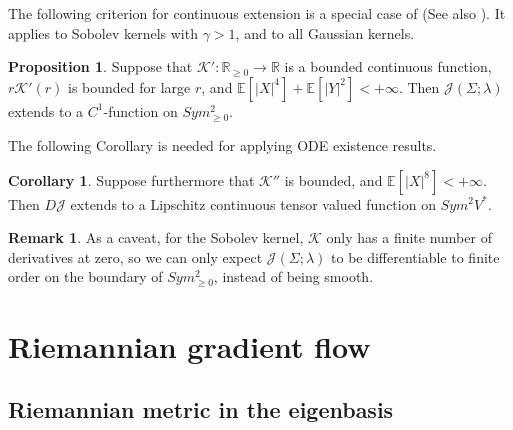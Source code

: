 \documentclass[a4paper]{article}
\theoremstyle{definition}
\newtheorem{cor}[thm]{Corollary}
\newtheorem{rmk}{Remark}
\newtheorem{prop}[thm]{Proposition}
\newcommand{\R}{\mathbb{R}}
\newcommand{\E}{\mathbb{E}}
\newcommand{\1}{\mathbbm{1}}
\begin{document}
	
	
	The following criterion for continuous extension is a special case of \cite[Proposition 4.7]{RuanLi} (See also \cite[Example 4.8]{RuanLi}). It applies to Sobolev kernels with $\gamma>1$, and to all Gaussian kernels. 
	
	
	\begin{prop}\label{prop:continuousextensionJ}
		Suppose that $\mathcal{K}':\R_{\geq 0}\to \R$ is a bounded continuous function, $r\mathcal{K}'(r)$ is bounded for large $r$, and $\E[|X|^4]+ \E[|Y|^2]<+\infty$. 
		Then
		$\mathcal{J}(\Sigma;\lambda)$ extends to a $C^1$-function on  $Sym^2_{\geq 0}$.
	\end{prop}
	
	
	
	
	The following Corollary is needed for applying ODE existence results.
	
	
	\begin{cor}\label{cor:Lipextension}\cite[Corollary 4.10]{RuanLi}
		Suppose furthermore that $\mathcal{K}''$ is bounded, and $\E[|X|^8]<+\infty$. Then  $D\mathcal{J}$ extends to a Lipschitz continuous tensor valued function on $Sym^2 V^*$.
	\end{cor}
	
	
	
	
	
	
	
	\begin{rmk}
		As a caveat, for the Sobolev kernel, $\mathcal{K}$ only has a finite number of derivatives at zero, so we can only expect $\mathcal{J}(\Sigma;\lambda)$ to be differentiable to finite order on the boundary of $Sym^2_{\geq 0}$, instead of being smooth.
	\end{rmk}
	
	
	
	\section{Riemannian gradient flow}
	
	
	
	
	
	\subsection{Riemannian metric in the eigenbasis}\label{Sect:Riemannianmetriceigenbasis}
	
	
	
\end{document}
